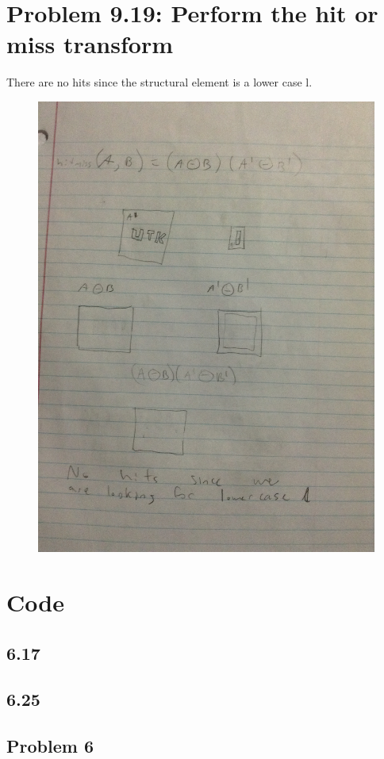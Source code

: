 \documentclass{article}
\begin{document}
	\section{Problem 9.19: Perform the hit or miss transform}
	There are no hits since the structural element is a lower case l.
	\begin{figure}[H]
		\includegraphics[width=\linewidth]{9.19/fig1.JPG}
	\end{figure}
	
	\newpage
	\section{Code}
	\subsection{6.17}
	
	
	
	\subsection{6.25}
	
	\subsection{Problem 6}
	
\end{document}
